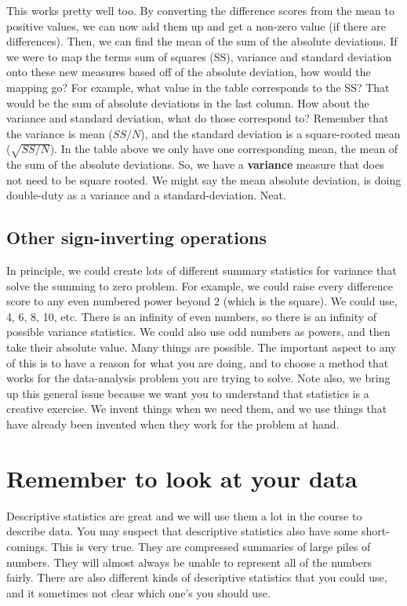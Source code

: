 \documentclass[
]{book}
\begin{document}
This works pretty well too. By converting the difference scores from the mean to positive values, we can now add them up and get a non-zero value (if there are differences). Then, we can find the mean of the sum of the absolute deviations. If we were to map the terms sum of squares (SS), variance and standard deviation onto these new measures based off of the absolute deviation, how would the mapping go? For example, what value in the table corresponds to the SS? That would be the sum of absolute deviations in the last column. How about the variance and standard deviation, what do those correspond to? Remember that the variance is mean (\(SS/N\)), and the standard deviation is a square-rooted mean (\(\sqrt{SS/N}\)). In the table above we only have one corresponding mean, the mean of the sum of the absolute deviations. So, we have a \textbf{variance} measure that does not need to be square rooted. We might say the mean absolute deviation, is doing double-duty as a variance and a standard-deviation. Neat.

\subsection{Other sign-inverting operations}\label{other-sign-inverting-operations}

In principle, we could create lots of different summary statistics for variance that solve the summing to zero problem. For example, we could raise every difference score to any even numbered power beyond 2 (which is the square). We could use, 4, 6, 8, 10, etc. There is an infinity of even numbers, so there is an infinity of possible variance statistics. We could also use odd numbers as powers, and then take their absolute value. Many things are possible. The important aspect to any of this is to have a reason for what you are doing, and to choose a method that works for the data-analysis problem you are trying to solve. Note also, we bring up this general issue because we want you to understand that statistics is a creative exercise. We invent things when we need them, and we use things that have already been invented when they work for the problem at hand.

\section{Remember to look at your data}\label{remember-to-look-at-your-data}

Descriptive statistics are great and we will use them a lot in the course to describe data. You may suspect that descriptive statistics also have some short-comings. This is very true. They are compressed summaries of large piles of numbers. They will almost always be unable to represent all of the numbers fairly. There are also different kinds of descriptive statistics that you could use, and it sometimes not clear which one's you should use.
\end{document}

